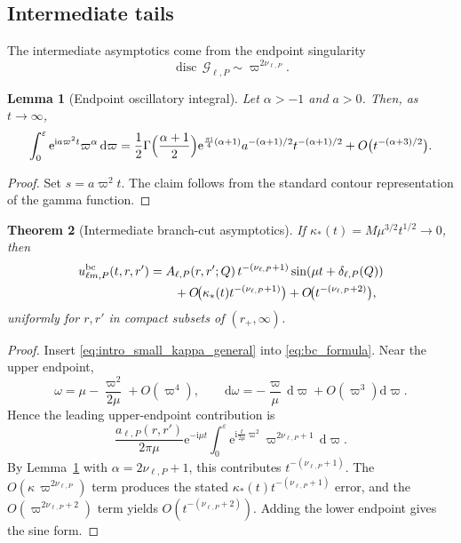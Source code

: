 \documentclass[12pt]{article}
\numberwithin{equation}{section}
\theoremstyle{plain}
\newtheorem{theorem}{Theorem}[section]
\newtheorem{lemma}[theorem]{Lemma}
\theoremstyle{definition}
\theoremstyle{remark}
\newcommand{\ii}{\mathrm i}
\newcommand{\ee}{\mathrm e}
\newcommand{\dd}{\mathrm d}
\newcommand{\disc}{\operatorname{disc}}
\newcommand{\bc}{\mathrm{bc}}
\newcommand{\cG}{\mathcal G}
\newcommand{\om}{\omega}
\newcommand{\vp}{\varpi}
\newcommand{\kap}{\kappa}
\newcommand{\eps}{\varepsilon}
\begin{document}
\subsection{Intermediate tails}

The intermediate asymptotics come from the endpoint singularity
\[
   \disc\,\cG_{\ell,P}\sim \vp^{2\nu_{\ell,P}}.
\]

\begin{lemma}[Endpoint oscillatory integral]\label{lem:endpoint_integral}
Let $\alpha>-1$ and $a>0$.  Then, as $t\to\infty$,
\begin{equation}\label{eq:endpoint_integral}
   \int_0^\eps\ee^{\ii a\vp^2 t}\vp^\alpha\,\dd\vp
   =
   \frac12
   \Gamma\Bigl(\frac{\alpha+1}{2}\Bigr)
   \ee^{\frac{\pi\ii}{4}(\alpha+1)}
   a^{-(\alpha+1)/2}
   t^{-(\alpha+1)/2}
   +O\bigl(t^{-(\alpha+3)/2}\bigr).
\end{equation}
\end{lemma}

\begin{proof}
Set $s=a\vp^2 t$.  The claim follows from the standard contour representation of the gamma function.
\end{proof}

\begin{theorem}[Intermediate branch-cut asymptotics]\label{thm:intermediate}
If $\kap_*(t)=M\mu^{3/2}t^{1/2}\to0$, then
\begin{align}\label{eq:intermediate_explicit}
   u_{\ell m,P}^{\bc}(t,r,r')
   &=
   A_{\ell,P}(r,r';Q)\,t^{-(\nu_{\ell,P}+1)}
   \sin(\mu t+\delta_{\ell,P}(Q))
   \notag\\
   &\qquad
   +O\!\bigl(\kap_*(t)t^{-(\nu_{\ell,P}+1)}\bigr)
   +O\!\bigl(t^{-(\nu_{\ell,P}+2)}\bigr),
\end{align}
uniformly for $r,r'$ in compact subsets of $(r_+,\infty)$.
\end{theorem}

\begin{proof}
Insert \eqref{eq:intro_small_kappa_general} into \eqref{eq:bc_formula}.  Near the upper endpoint,
\[
   \om=\mu-\frac{\vp^2}{2\mu}+O(\vp^4),
   \qquad
   \dd\om=-\frac{\vp}{\mu}\,\dd\vp+O(\vp^3)\dd\vp.
\]
Hence the leading upper-endpoint contribution is
\[
   \frac{a_{\ell,P}(r,r')}{2\pi\mu}
   \ee^{-\ii\mu t}
   \int_0^\eps
   \ee^{\ii\frac{t}{2\mu}\vp^2}\vp^{2\nu_{\ell,P}+1}\,\dd\vp.
\]
By Lemma~\ref{lem:endpoint_integral} with $\alpha=2\nu_{\ell,P}+1$, this contributes $t^{-(\nu_{\ell,P}+1)}$.  The $O(\kap\,\vp^{2\nu_{\ell,P}})$ term produces the stated $\kap_*(t)t^{-(\nu_{\ell,P}+1)}$ error, and the $O(\vp^{2\nu_{\ell,P}+2})$ term yields $O(t^{-(\nu_{\ell,P}+2)})$.  Adding the lower endpoint gives the sine form.
\end{proof}
\end{document}
